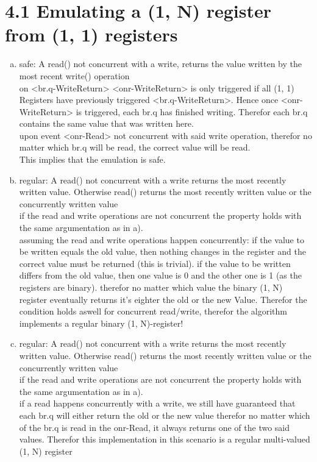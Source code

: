 \documentclass{article}
\begin{document}
	\pagestyle{fancy}
	
    \section*{4.1 Emulating a (1, N) register from (1, 1) registers}
    \begin{enumerate}[(a)]
        \item safe: A read() not concurrent with a write, returns the value written by the most recent write() operation\\
        on <br.q-WriteReturn> <onr-WriteReturn> is only triggered if all (1, 1) Registers have previously triggered <br.q-WriteReturn>. Hence once <onr-WriteReturn> is triggered, each br.q has finished writing.
        Therefor each br.q contains the same value that was written here.\\
        upon event <onr-Read> not concurrent with said write operation, therefor no matter which br.q will be read, the correct value will be read.\\
        This implies that the emulation is safe.
        \item regular: A read() not concurrent with a write returns the most recently written value. Otherwise read() returns the most recently written value or the concurrently written value\\
        if the read and write operations are not concurrent the property holds with the same argumentation as in a).\\
        assuming the read and write operations happen concurrently: 
        if the value to be written equals the old value, then nothing changes in the register and the correct value must be returned (this is trivial).
        if the value to be written differs from the old value, then one value is 0 and the other one is 1 (as the registers are binary). therefor no matter which value the binary (1, N) register eventually returns it's eighter the old or the new Value.
        Therefor the condition holds aswell for concurrent read/write, therefor the algorithm implements a regular binary (1, N)-register!
        \item regular: A read() not concurrent with a write returns the most recently written value. Otherwise read() returns the most recently written value or the concurrently written value\\
        if the read and write operations are not concurrent the property holds with the same argumentation as in a).\\
        if a read happens concurrently with a write, we still have guaranteed that each br.q will either return the old or the new value therefor no matter which of the br.q is read in the onr-Read, it always returns one of the two said values.
        Therefor this implementation in this scenario is a regular multi-valued (1, N) register
    \end{enumerate}
\end{document}
